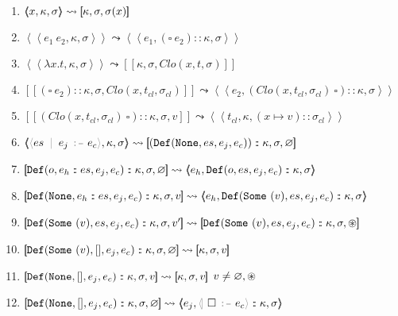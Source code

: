 \documentclass[english, references=cleveref]{programming}
\newcommand{\leval}{\left\langle\!\!\left\langle}
\newcommand{\reval}{\right\rangle\!\!\right\rangle}
\newcommand{\lcont}{\left[\!\!\left[}
\newcommand{\rcont}{\right]\!\!\right]}
\newcommand{\cons}{:\!:}
\begin{document}
\begin{figure}

  \begin{enumerate}
    \item \label{fig:rulevar} $\leval \synvar x, \kappa, \sigma \reval \leadsto \lcont\kappa, \sigma, \sigma(x) \rcont$
    \item \label{fig:ruleapp} $\leval e_1\ e_2, \kappa, \sigma \reval \leadsto \leval e_1, (\square\ e_2) \cons \kappa, \sigma \reval $
    \item \label{fig:ruleclo} $\leval \lambda x. t, \kappa, \sigma \reval \leadsto \lcont\kappa, \sigma, Clo (x, t, \sigma) \rcont$ %
    \item \label{fig:rulearg} $\lcont (\square\ e_2) \cons \kappa, \sigma, Clo (x, t_{cl}, \sigma_{cl}) \rcont \leadsto \leval e_2, (Clo(x, t_{cl}, \sigma_{cl})\ \square) \cons \kappa, \sigma \reval$
    \item  \label{fig:rulebeta} $\lcont(Clo(x, t_{cl}, \sigma_{cl})\ \square) \cons \kappa, \sigma, v \rcont \leadsto \leval t_{cl}, \kappa, (x\mapsto v) \cons\sigma_{cl} \reval$
    \item \label{fig:ruledefault} $\leval \synlangle es \synmid e_j \synjust e_c \synrangle, \kappa, \sigma \reval \leadsto \lcont (\mathtt{Def}(\synnone, es, e_j, e_c)) \cons \kappa, \sigma, \synempty \rcont$
    \item \label{fig:ruledefaultunpack} $\lcont \mathtt{Def}(o, e_h \cons es, e_j, e_c) \cons \kappa, \sigma, \synempty \rcont \leadsto \leval e_h, \mathtt{Def}(o, es, e_j, e_c) \cons \kappa, \sigma \reval$
    \item \label{fig:ruledefaultnone} $\lcont \mathtt{Def}(\synnone, e_h \cons es, e_j, e_c) \cons \kappa, \sigma, v \rcont \leadsto \leval e_h, \mathtt{Def}(\synsome(v), es, e_j, e_c) \cons \kappa, \sigma \reval$
    \item  \label{fig:ruledefaultconflict} $\lcont \mathtt{Def}(\synsome(v), es, e_j, e_c) \cons \kappa, \sigma, v' \rcont \leadsto \lcont \mathtt{Def}(\synsome(v), es, e_j, e_c)  \cons \kappa, \sigma, \synconflict \rcont$
    \item \label{fig:ruledefaultvalue} $\lcont \mathtt{Def}(\synsome(v), [], e_j, e_c) \cons \kappa, \sigma, \synempty \rcont \leadsto \lcont \kappa, \sigma, v \rcont$
    \item \label{fig:ruledefaultnonefinal} $\lcont \mathtt{Def}(\synnone, [], e_j, e_c) \cons \kappa, \sigma, v \rcont \leadsto \lcont \kappa, \sigma, v \rcont$ \hfill $v \neq \varnothing, \circledast$
    \item \label{fig:ruledefaultbase} $\lcont \mathtt{Def}(\synnone, [], e_j, e_c) \cons \kappa, \sigma, \synempty \rcont \leadsto \leval e_j, \synlanglemid \square \synjust e_c \synrangle \cons \kappa, \sigma \reval$

\end{enumerate}
\end{figure}
\end{document}
